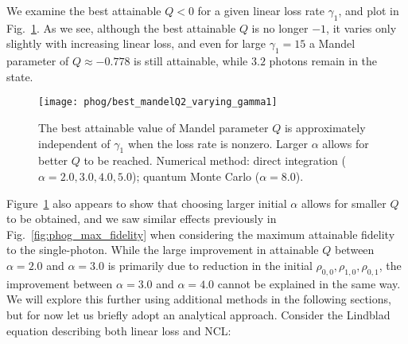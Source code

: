 We examine the best attainable $Q<0$ for a given linear loss rate $\gamma_1$, and plot in Fig.~\ref{fig:phog_ncl_best_Q_gamma1}. As we see, although the best attainable $Q$ is no longer $-1$, it varies only slightly with increasing linear loss, and even for large $\gamma_1=15$ a Mandel parameter of $Q \approx -0.778$ is still attainable, while $3.2$ photons remain in the state.


\begin{figure}
\captionsetup{width=0.8\linewidth}
\centering
\texttt{[image: phog/best\_mandelQ2\_varying\_gamma1]}
\caption{\label{fig:phog_ncl_best_Q_gamma1} The best attainable value of Mandel parameter $Q$ is approximately independent of $\gamma_1$ when the loss rate is nonzero. Larger $\alpha$ allows for better $Q$ to be reached. Numerical method: direct integration ($\alpha = 2.0, 3.0, 4.0, 5.0$); quantum Monte Carlo ($\alpha = 8.0$).}
\end{figure}

Figure~\ref{fig:phog_ncl_best_Q_gamma1} also appears to show that choosing larger initial $\alpha$ allows for smaller $Q$ to be obtained, and we saw similar effects previously in Fig.~\ref{fig:phog_max_fidelity} when considering the maximum attainable fidelity to the single-photon. While the large improvement in attainable $Q$ between $\alpha=2.0$ and $\alpha=3.0$ is primarily due to reduction in the initial $\rho_{0, 0}, \rho_{1, 0}, \rho_{0, 1}$, the improvement between $\alpha=3.0$ and $\alpha=4.0$ cannot be explained in the same way. We will explore this further using additional methods in the following sections, but for now let us briefly adopt an analytical approach. Consider the Lindblad equation describing both linear loss and NCL:

